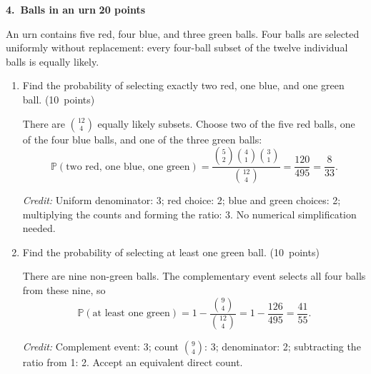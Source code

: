 \documentclass[11pt,letterpaper]{article}
\newcommand{\Prob}{\mathbb P}
\newcommand{\partpts}[1]{\unskip\nobreak\hspace{.3em}%
  \mbox{\small\color{muted}(#1 points)}}
\newcommand{\credit}[1]{\par{\footnotesize\color{muted}\textit{Credit:} #1}}
\newcommand{\problem}[3]{\par\addvspace{9pt}%
  {\large\bfseries\color{indigo}#1.\ #2}\hfill
  {\small\color{muted}\textbf{#3 points}}\par\nobreak}
\begin{document}
\problem{4}{Balls in an urn}{20}
An urn contains five red, four blue, and three green balls. Four balls
are selected uniformly without replacement: every four-ball subset
of the twelve individual balls is equally likely.
\begin{enumerate}
\item Find the probability of selecting exactly two red, one blue,
and one green ball. \partpts{10}
\begin{solution}[1.25in]
There are $\binom{12}{4}$ equally likely subsets. Choose two of the
five red balls, one of the four blue balls, and one of the three green balls:
\[
\Prob(\text{two red, one blue, one green})
=\frac{\binom52\binom41\binom31}{\binom{12}4}
=\frac{120}{495}=\frac8{33}.
\]
\credit{Uniform denominator: 3; red choice: 2; blue and green choices: 2;
multiplying the counts and forming the ratio: 3. No numerical simplification needed.}
\end{solution}
\item Find the probability of selecting at least one green ball.
\partpts{10}
\begin{solution}[1.25in]
There are nine non-green balls. The complementary event selects all
four balls from these nine, so
\[
\Prob(\text{at least one green})
=1-\frac{\binom94}{\binom{12}4}
=1-\frac{126}{495}=\frac{41}{55}.
\]
\credit{Complement event: 3; count $\binom94$: 3; denominator: 2;
subtracting the ratio from 1: 2. Accept an equivalent direct count.}
\end{solution}
\end{enumerate}
\end{document}
